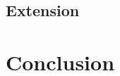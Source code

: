 \documentclass[11pt,a4paper]{article}
\begin{document}
\subsection{Extension}



\section{Conclusion}
\newpage



	
\end{document}
